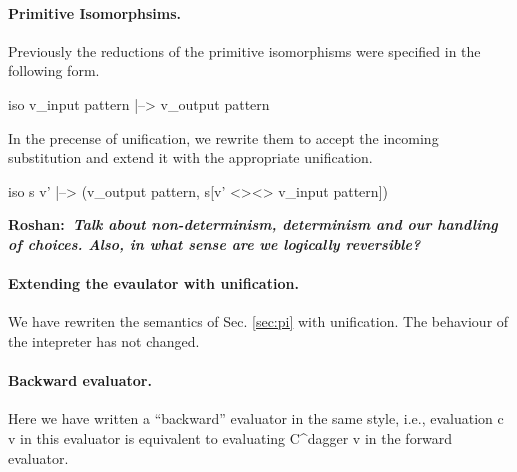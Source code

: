 \documentclass[preprint]{sigplanconf}
\newcommand{\xcomment}[2]{\textbf{#1:~\textsl{#2}}}
\newcommand{\roshan}[1]{\xcomment{Roshan}{#1}}
\begin{document}
\paragraph{Primitive Isomorphsims.}
Previously the reductions of the primitive isomorphisms were specified
in the following form.

{{ iso v_{input pattern} |--> v_{output pattern} }}

\noindent
In the precense of unification, we rewrite them to accept the incoming
substitution and extend it with the appropriate unification.

{{ iso s v' |--> (v_{output pattern}, s[v' <><> v_{input pattern}]) }}


\roshan{Talk about non-determinism, determinism and our handling of
  choices. Also, in what sense are we logically reversible?}

\paragraph{Extending the evaulator with unification.} 
We have rewriten the semantics of Sec. \ref{sec:pi} with
unification. The behaviour of the intepreter has not changed.


\paragraph{Backward evaluator.}
Here we have written a ``backward'' evaluator in the same style, 
i.e., evaluation {{c v}} in this evaluator is equivalent to evaluating
{{C^{dagger} v}} in the forward evaluator.
\end{document}
